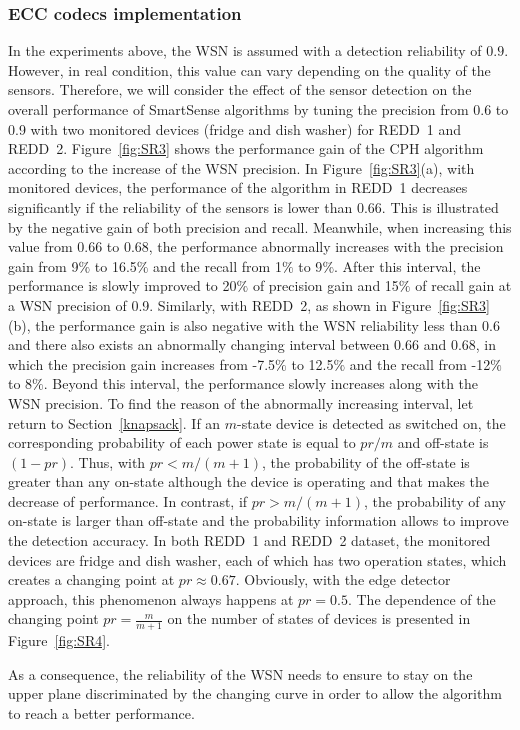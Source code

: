 \subsubsection{ECC codecs implementation}

In the experiments above, the WSN is assumed with a detection reliability of $0.9$. However, in real condition, this value can vary depending on the quality of the sensors. Therefore, we will consider the effect of the sensor detection on the overall performance of SmartSense algorithms by tuning the precision from 0.6 to 0.9 with two monitored devices (fridge and dish washer) for REDD~1 and REDD~2. Figure~\ref{fig:SR3} shows the performance gain of the CPH algorithm according to the increase of the WSN precision. 
In Figure~\ref{fig:SR3}(a), with monitored devices, the performance of the algorithm in REDD~1 decreases significantly if the reliability of the sensors is lower than 0.66. This is illustrated by the negative gain of both precision and recall. Meanwhile, when increasing this value from 0.66 to 0.68, the performance abnormally increases with the precision gain from 9$\%$ to 16.5$\%$ and the recall from 1$\%$ to 9$\%$. After this interval, the performance is slowly improved to 20$\%$ of precision gain and 15$\%$ of recall gain at a WSN precision of 0.9.
Similarly, with REDD~2, as shown in Figure~\ref{fig:SR3}(b), the performance gain is also negative with the WSN reliability less than 0.6 and there also exists an abnormally changing interval between 0.66 and 0.68, in which the precision gain increases from -7.5$\%$ to 12.5$\%$ and the recall from -12$\%$ to 8$\%$. Beyond this interval, the performance slowly increases along with the WSN precision.
To find the reason of the abnormally increasing interval, let return to Section~\ref{knapsack}. If an $m$-state device is detected as switched on, the corresponding probability of each power state is equal to $pr/m$ and off-state is $(1-pr)$. Thus, with $pr<m/(m+1)$, the probability of the off-state is greater than any on-state although the device is operating and that makes the decrease of performance. In contrast, if $pr>m/(m+1)$, the probability of any on-state is larger than off-state and the probability information allows to improve the detection accuracy. In both REDD~1 and REDD~2 dataset, the monitored devices are fridge and dish washer, each of which has two operation states, which creates a changing point at $pr\approx 0.67$. Obviously, with the edge detector approach, this phenomenon always happens at $pr = 0.5$. 
The dependence of the changing point $pr=\frac{m}{m+1}$ on the number of states of devices is presented in Figure~\ref{fig:SR4}. \par As a consequence, the reliability of the WSN needs to ensure to stay on the upper plane discriminated by the changing curve in order to allow the algorithm to reach a better performance. 










